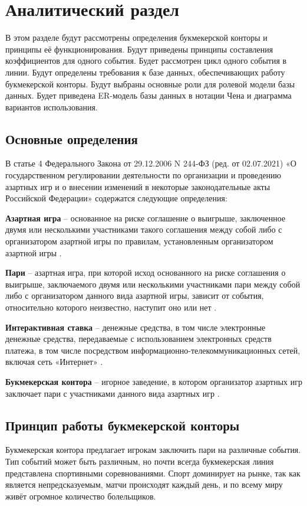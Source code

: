 \section{Аналитический раздел}
В этом разделе будут рассмотрены определения букмекерской конторы и принципы её функционирования.
Будут приведены принципы составления коэффициентов для одного события.
Будет рассмотрен цикл одного события в линии. 
Будут определены требования к базе данных, обеспечивающих работу букмекерской конторы. 
Будут выбраны основные роли для ролевой модели базы данных.
Будет приведена ER-модель базы данных в нотации Чена и диаграмма вариантов использования.

\subsection{Основные определения}
В статье 4 Федерального Закона от 29.12.2006 N 244-ФЗ (ред. от 02.07.2021) «О государственном регулировании деятельности по организации и проведению азартных игр и о внесении изменений в некоторые законодательные акты Российской Федерации» \cite{bk} содержатся следующие определения:

\textbf{Азартная игра} -- основанное на риске соглашение о выигрыше, заключенное двумя или несколькими участниками такого соглашения между собой либо с организатором азартной игры по правилам, установленным организатором азартной игры \cite{bk}.

\textbf{Пари} -- азартная игра, при которой исход основанного на риске соглашения о выигрыше, заключаемого двумя или несколькими участниками пари между собой либо с организатором данного вида азартной игры, зависит от события, относительно которого неизвестно, наступит оно или нет \cite{bk}.

\textbf{Интерактивная ставка} -- денежные средства, в том числе электронные денежные средства, передаваемые с использованием электронных средств платежа, в том числе посредством информационно-телекоммуникационных сетей, включая сеть «Интернет» \cite{bk}.

\textbf{Букмекерская контора} -- игорное заведение, в котором организатор азартных игр заключает пари с участниками данного вида азартных игр \cite{bk}.

\subsection{Принцип работы букмекерской конторы}
Букмекерская контора предлагает игрокам заключить пари на различные события. 
Тип событий может быть различным, но почти всегда букмекерская линия представлена спортивными соревнованиями.
Спорт доминирует на рынке, так как является непредсказуемым, матчи происходят каждый день, и по всему миру живёт огромное количество болельщиков.

